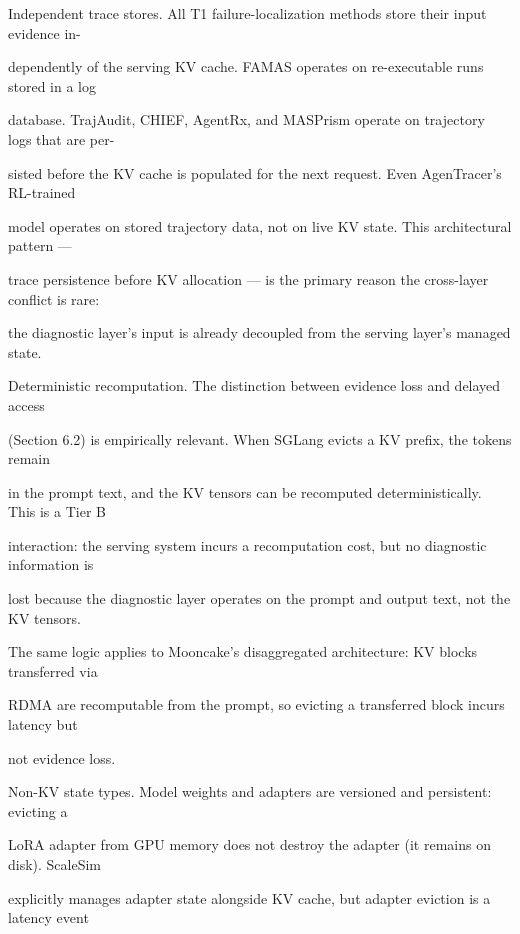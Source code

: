 \begin{flushleft}
\par\smallskip
\noindent Independent trace stores. All T1 failure-localization methods store their input evidence in-\par
\noindent dependently of the serving KV cache. FAMAS operates on re-executable runs stored in a log\par
\noindent database. TrajAudit, CHIEF, AgentRx, and MASPrism operate on trajectory logs that are per-\par
\noindent sisted before the KV cache is populated for the next request. Even AgenTracer’s RL-trained\par
\noindent model operates on stored trajectory data, not on live KV state. This architectural pattern —\par
\noindent trace persistence before KV allocation — is the primary reason the cross-layer conflict is rare:\par
\noindent the diagnostic layer’s input is already decoupled from the serving layer’s managed state.\par
\par\smallskip
\noindent Deterministic recomputation. The distinction between evidence loss and delayed access\par
\noindent (Section 6.2) is empirically relevant. When SGLang evicts a KV prefix, the tokens remain\par
\noindent in the prompt text, and the KV tensors can be recomputed deterministically. This is a Tier B\par
\noindent interaction: the serving system incurs a recomputation cost, but no diagnostic information is\par
\noindent lost because the diagnostic layer operates on the prompt and output text, not the KV tensors.\par
\noindent The same logic applies to Mooncake’s disaggregated architecture: KV blocks transferred via\par
\noindent RDMA are recomputable from the prompt, so evicting a transferred block incurs latency but\par
\noindent not evidence loss.\par
\par\smallskip
\noindent Non-KV state types. Model weights and adapters are versioned and persistent: evicting a\par
\noindent LoRA adapter from GPU memory does not destroy the adapter (it remains on disk). ScaleSim\par
\noindent explicitly manages adapter state alongside KV cache, but adapter eviction is a latency event\par

\end{flushleft}
